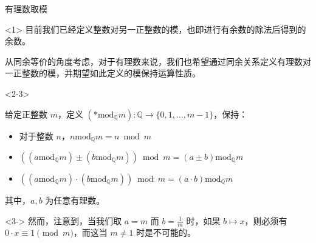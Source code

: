 \documentclass{../pkslide}
\begin{document}
\begin{frame}{有理数取模}
  \begin{onlyenv}<1>
    目前我们已经定义整数对另一正整数的模，也即进行有余数的除法后得到的余数。
    
    \emptyline
    
    从同余等价的角度考虑，对于有理数来说，我们也希望通过同余关系定义有理数对一正整数的模，并期望如此定义的模保持运算性质。
  \end{onlyenv}
  
  \begin{onlyenv}<2-3>
    \begin{definition}[有理数取模]
      给定正整数 $m$，定义 $({\ast} \mathbin{\mathrm{mod}_{\mathbb Q}} m) : \mathbb Q \to \{ 0, 1, \ldots, m - 1 \}$，保持：
      
      \begin{itemize}
        \item 对于整数 $n$，$n \mathbin{\mathrm{mod}_{\mathbb Q}} m = n \bmod m$
        \item $((a \mathbin{\mathrm{mod}_{\mathbb Q}} m) \pm (b \mathbin{\mathrm{mod}_{\mathbb Q}} m)) \bmod m = (a \pm b) \mathbin{\mathrm{mod}_{\mathbb Q}} m$
        \item $((a \mathbin{\mathrm{mod}_{\mathbb Q}} m) \cdot (b \mathbin{\mathrm{mod}_{\mathbb Q}} m)) \bmod m = (a \cdot b) \mathbin{\mathrm{mod}_{\mathbb Q}} m$
      \end{itemize}
      
      其中，$a, b$ 为任意有理数。
    \end{definition}
    
    \begin{visibleenv}<3->
      然而，注意到，当我们取 $a = m$ 而 $b = \frac{1}{m}$ 时，如果 $b \mapsto x$，则必须有 $0 \cdot x \equiv 1 \pmod{m}$，而这当 $m \ne 1$ 时是不可能的。
    \end{visibleenv}
  \end{onlyenv}
\end{frame}
\end{document}

